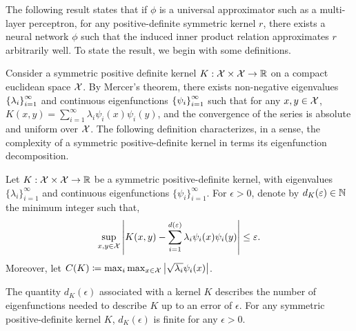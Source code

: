 
The following result states that if $\phi$ is a universal approximator such as a multi-layer perceptron, for any positive-definite symmetric kernel $r$, there exists a neural network $\phi$ such that the induced inner product relation approximates $r$ arbitrarily well. To state the result, we begin with some definitions.

Consider a symmetric positive definite kernel $K: {\mathcal{X}} \times {\mathcal{X}} \to \mathbb{R}$ on a compact euclidean space ${\mathcal{X}}$. By Mercer's theorem\parencite{mercerFunctionsPositive1909, sunMercerTheorem2005, micchelliUniversalKernels2006}, there exists non-negative eigenvalues $\left\{\lambda_i\right\}_{i=1}^{\infty}$ and continuous eigenfunctions $\left\{\psi_i\right\}_{i=1}^{\infty}$ such that for any $x,y \in {\mathcal{X}}$, $K(x, y) = \sum_{i=1}^\infty \lambda_i \psi_i(x) \psi_i(y)$, and the convergence of the series is absolute and uniform over ${\mathcal{X}}$. The following definition characterizes, in a sense, the complexity of a symmetric positive-definite kernel in terms its eigenfunction decomposition.

\begin{definition}\label{def:sym_pd_ker_specturm_decay}
	Let $K: {\mathcal{X}} \times {\mathcal{X}} \to \mathbb{R}$ be a symmetric positive-definite kernel, with eigenvalues $\{\lambda_i\}_{i=1}^{\infty}$ and continuous eigenfunctions $\{\psi_i\}_{i=1}^{\infty}$. For $\epsilon > 0$, denote by $d_K(\varepsilon) \in \mathbb{N}$ the minimum integer such that,
	\begin{equation*}
		\sup_{x, y \in \calX} \abs{K(x, y) - \sum_{i=1}^{d(\epsilon)} \lambda_i \psi_i(x) \psi_i(y)} \leq \epsilon.
	\end{equation*}
	Moreover, let $C(K) \coloneq \max_{i} \max_{x \in {\mathcal{X}}} \left\lvert\sqrt{\lambda_i} \psi_i(x)\right\rvert$.
\end{definition}


The quantity $d_K(\epsilon)$ associated with a kernel $K$ describes the number of eigenfunctions needed to describe $K$ up to an error of $\epsilon$. For any symmetric positive-definite kernel $K$, $d_K(\epsilon)$ is finite for any $\epsilon > 0$.

